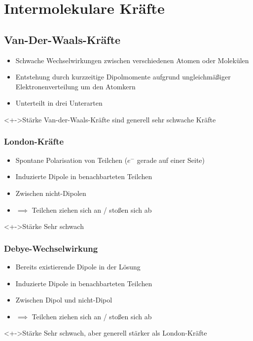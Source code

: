 \chapter{Intermolekulare Kräfte}
\section{Van-Der-Waals-Kräfte}

\begin{itemize}
	\item<+-> Schwache Wechselwirkungen zwischen verschiedenen Atomen oder Molekülen
	\item<+-> Entstehung durch kurzzeitige Dipolmomente aufgrund ungleichmäßiger Elektronenverteilung um den Atomkern
	\item<+-> Unterteilt in drei Unterarten
\end{itemize}
\begin{block}<+->{Stärke}
	Van-der-Waals-Kräfte sind generell sehr schwache Kräfte
\end{block}


\subsection{London-Kräfte}

\begin{itemize}
	\item<+-> Spontane Polarisation von Teilchen ($e^-$  gerade auf einer Seite)
	\item<+-> Induzierte Dipole in benachbarteten Teilchen
	\item<+-> Zwischen nicht-Dipolen
	\item<+-> $\implies$ Teilchen ziehen sich an / stoßen sich ab
\end{itemize}
\begin{block}<+->{Stärke}
	Sehr schwach
\end{block}


\subsection{Debye-Wechselwirkung}

\begin{itemize}
	\item<+-> Bereits existierende Dipole in der Lösung
	\item<+-> Induzierte Dipole in benachbarteten Teilchen
	\item<+-> Zwischen Dipol und nicht-Dipol
	\item<+-> $\implies$ Teilchen ziehen sich an / stoßen sich ab
\end{itemize}
\begin{block}<+->{Stärke}
	Sehr schwach, aber generell stärker als London-Kräfte
\end{block}



